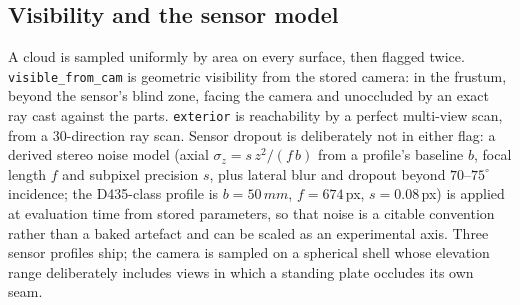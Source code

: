 \documentclass[letterpaper, 10 pt, conference]{ieeeconf}
\newcommand{\mm}{\,mm}
\begin{document}
\subsection{Visibility and the sensor model}
A cloud is sampled uniformly by area on every surface, then flagged twice. \texttt{visible\_from\_cam} is geometric visibility from the stored camera: in the frustum, beyond the sensor's blind zone, facing the camera and unoccluded by an exact ray cast against the parts. \texttt{exterior} is reachability by a perfect multi-view scan, from a 30-direction ray scan. Sensor dropout is deliberately not in either flag: a derived stereo noise model (axial $\sigma_z = s\,z^2/(f\,b)$ from a profile's baseline $b$, focal length $f$ and subpixel precision $s$, plus lateral blur and dropout beyond $70$--$75^\circ$ incidence; the D435-class profile is $b=50\mm$, $f=674$\,px, $s=0.08$\,px) is applied at evaluation time from stored parameters, so that noise is a citable convention rather than a baked artefact and can be scaled as an experimental axis. Three sensor profiles ship; the camera is sampled on a spherical shell whose elevation range deliberately includes views in which a standing plate occludes its own seam.
\end{document}
